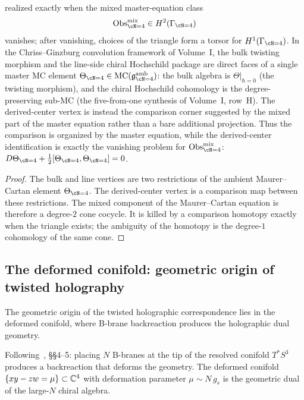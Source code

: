 \begin{proposition}[The Koszul comparison criterion for $\mathcal{N}=4$]
realized exactly when the mixed master-equation class
\[
\Obs_{\cN=4}^{\mathrm{mix}}\in H^2(\Gamma_{\cN=4})
\]
vanishes; after vanishing, choices of the triangle form a torsor for
$H^1(\Gamma_{\cN=4})$.
In the Chriss--Ginzburg convolution framework of Volume~I,
the bulk twisting morphism and the line-side chiral Hochschild
package are direct faces of a single master MC element
$\Theta_{\cN=4} \in
\operatorname{MC}(\mathfrak{g}^{\mathrm{amb}}_{\cN=4})$:
the bulk algebra is $\Theta\big|_{\hbar=0}$ (the twisting
morphism), and the chiral Hochschild cohomology is the
degree-preserving sub-MC
\textup{(}the five-from-one synthesis of Volume~I, row~H\textup{)}.
The derived-center vertex is instead the comparison corner suggested
by the mixed part of the master equation rather than a bare
additional projection. Thus the comparison is organized by the master equation, while the
derived-center identification is exactly the vanishing problem for
$\Obs_{\cN=4}^{\mathrm{mix}}$:
$D\Theta_{\cN=4} + \tfrac{1}{2}[\Theta_{\cN=4},\Theta_{\cN=4}] = 0$.
\end{proposition}

\begin{proof}
The bulk and line vertices are two restrictions of the ambient Maurer--Cartan element
$\Theta_{\cN=4}$. The derived-center vertex is a comparison map between these restrictions.
The mixed component of the Maurer--Cartan equation is therefore a degree-$2$ cone cocycle.
It is killed by a comparison homotopy exactly when the triangle exists; the ambiguity of the
homotopy is the degree-$1$ cohomology of the same cone.
\end{proof}

\subsection{The deformed conifold: geometric origin of twisted holography}
\label{subsec:deformed-conifold}

The geometric origin of the twisted holographic correspondence lies in
the deformed conifold, where B-brane backreaction produces the
holographic dual geometry.

\begin{proposition}
\label{prop:b-brane-backreaction}
Following~\cite{CG18}, \S\S4--5: placing $N$ B-branes at the tip of the
resolved conifold $T^*S^3$ produces a backreaction that deforms the
geometry. The deformed conifold $\{xy - zw = \mu\} \subset \mathbb C^4$ with
deformation parameter $\mu \sim N\,g_s$ is the geometric dual of the
large-$N$ chiral algebra.
\end{proposition}

